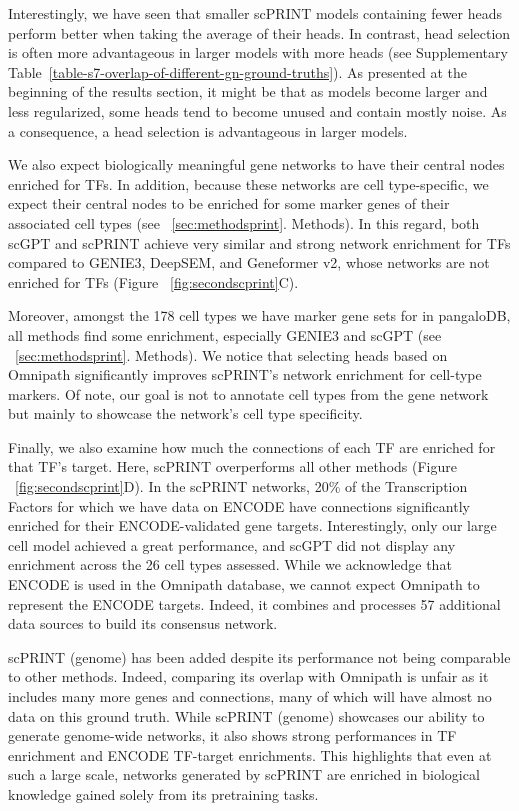 Interestingly, we have seen that smaller \gls{scPRINT} models containing fewer heads perform better when taking the average of their heads. In contrast, head selection is often more advantageous in larger models with more heads (see Supplementary Table~\ref{table-s7-overlap-of-different-gn-ground-truths}). As presented at the beginning of the results section, it might be that as models become larger and less regularized, some heads tend to become unused and contain mostly noise. As a consequence, a head selection is advantageous in larger models. 

We also expect biologically meaningful gene networks to have their central nodes enriched for \gls{TF}s. In addition, because these networks are cell type-specific, we expect their central nodes to be enriched for some marker genes of their associated cell types (see ~\ref{sec:methodsprint}. Methods). In this regard, both \gls{scGPT} and \gls{scPRINT} achieve very similar and strong network enrichment for \gls{TF}s compared to GENIE3, Deep\gls{SEM}, and Geneformer v2, whose networks are not enriched for \gls{TF}s (Figure ~\ref{fig:secondscprint}C).

Moreover, amongst the 178 cell types we have marker gene sets for in pangaloDB\citep{franzenPanglaoDBWebServer2019}, all methods find some enrichment, especially GENIE3 and \gls{scGPT} (see ~\ref{sec:methodsprint}. Methods). We notice that selecting heads based on Omnipath significantly improves \gls{scPRINT}'s network enrichment for cell-type markers. Of note, our goal is not to annotate cell types from the gene network but mainly to showcase the network's cell type specificity. 

Finally, we also examine how much the connections of each \gls{TF} are enriched for that \gls{TF}'s target. Here, \gls{scPRINT} overperforms all other methods (Figure ~\ref{fig:secondscprint}D). In the \gls{scPRINT} networks, 20\% of the Transcription Factors for which we have data on \gls{ENCODE} have connections significantly enriched for their \gls{ENCODE}-validated gene targets\citep{liberzonMolecularSignaturesDatabase2015}. Interestingly, only our large cell model achieved a great performance, and \gls{scGPT} did not display any enrichment across the 26 cell types assessed. While we acknowledge that \gls{ENCODE} is used in the Omnipath database, we cannot expect  Omnipath to represent the \gls{ENCODE} targets. Indeed, it combines and processes 57 additional data sources to build its consensus network.

\gls{scPRINT} (genome) has been added despite its performance not being comparable to other methods. Indeed, comparing its overlap with Omnipath is unfair as it includes many more genes and connections, many of which will have almost no data on this ground truth. While \gls{scPRINT} (genome) showcases our ability to generate genome-wide networks, it also shows strong performances in \gls{TF} enrichment and \gls{ENCODE} \gls{TF}-target enrichments. This highlights that even at such a large scale, networks generated by \gls{scPRINT} are enriched in biological knowledge gained solely from its pretraining tasks.

